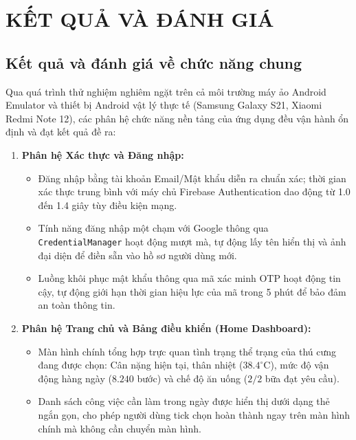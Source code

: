 \chapter{KẾT QUẢ VÀ ĐÁNH GIÁ}
\label{chap:ket_qua_danh_gia}

\section{Kết quả và đánh giá về chức năng chung}
\label{sec:danh_gia_chuc_nang_chung}

Qua quá trình thử nghiệm nghiêm ngặt trên cả môi trường máy ảo Android Emulator và thiết bị Android vật lý thực tế (Samsung Galaxy S21, Xiaomi Redmi Note 12), các phân hệ chức năng nền tảng của ứng dụng đều vận hành ổn định và đạt kết quả đề ra:

\begin{enumerate}
    \item \textbf{Phân hệ Xác thực và Đăng nhập:}
    \begin{itemize}
        \item Đăng nhập bằng tài khoản Email/Mật khẩu diễn ra chuẩn xác; thời gian xác thực trung bình với máy chủ Firebase Authentication dao động từ 1.0 đến 1.4 giây tùy điều kiện mạng.
        \item Tính năng đăng nhập một chạm với Google thông qua \texttt{CredentialManager} hoạt động mượt mà, tự động lấy tên hiển thị và ảnh đại diện để điền sẵn vào hồ sơ người dùng mới.
        \item Luồng khôi phục mật khẩu thông qua mã xác minh OTP hoạt động tin cậy, tự động giới hạn thời gian hiệu lực của mã trong 5 phút để bảo đảm an toàn thông tin.
    \end{itemize}

    \item \textbf{Phân hệ Trang chủ và Bảng điều khiển (Home Dashboard):}
    \begin{itemize}
        \item Màn hình chính tổng hợp trực quan tình trạng thể trạng của thú cưng đang được chọn: Cân nặng hiện tại, thân nhiệt ($38.4^\circ\text{C}$), mức độ vận động hàng ngày ($8.240$ bước) và chế độ ăn uống ($2/2$ bữa đạt yêu cầu).
        \item Danh sách công việc cần làm trong ngày được hiển thị dưới dạng thẻ ngắn gọn, cho phép người dùng tick chọn hoàn thành ngay trên màn hình chính mà không cần chuyển màn hình.
    \end{itemize}
\end{enumerate}

